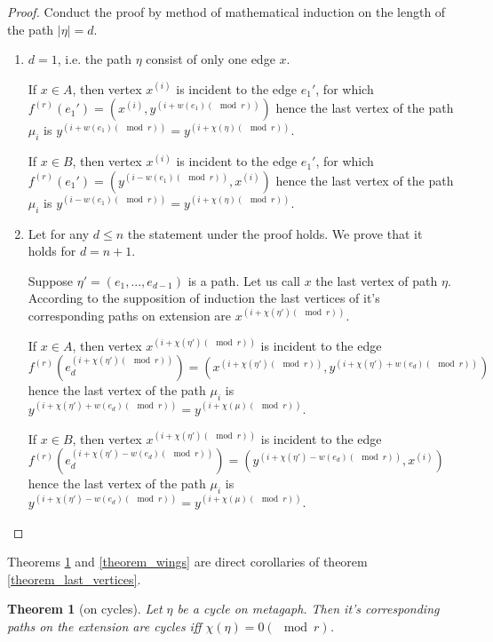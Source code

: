 \documentclass[14pt]{mmcs-article}
\newtheorem{theorem}{Theorem}
\begin{document}
\begin{proof}
    Conduct the proof by method of mathematical induction on the length of the path $|\eta| = d$.
    
    \begin{enumerate}
    \item $d = 1$, i.e. the path $\eta$ consist of only one edge $x$.
    
    If $x \in A$, then vertex $x^{(i)}$ is incident to the edge $e_1'$, for which $f^{(r)}(e_1') = (x^{(i)}, y^{(i + w(e_1) (\mod{r}))})$ hence the last vertex of the path $\mu_i$ is $y^{(i + w(e_1) (\mod{r}))} = y^{(i + \chi(\eta) (\mod{r}))}$.
    
    If $x \in B$, then vertex $x^{(i)}$ is incident to the edge $e_1'$, for which $f^{(r)}(e_1') = (y^{(i - w(e_1) (\mod{r}))}, x^{(i)})$ hence the last vertex of the path $\mu_i$ is $y^{(i - w(e_1) (\mod{r}))} = y^{(i + \chi(\eta) (\mod{r}))}$.
    
    \item Let for any $d \leq n$ the statement under the proof holds. We prove that it holds for $d = n + 1$.

    Suppose $\eta' = (e_1, ..., e_{d - 1})$ is a path. Let us call $x$ the last vertex of path $\eta$. According to the supposition of induction the last vertices of it's corresponding paths on extension are $x^{(i + \chi(\eta')(\mod{r}))}$.
    
    If $x \in A$, then vertex $x^{(i + \chi(\eta')(\mod{r}))}$ is incident to the edge $f^{(r)}(e_d^{(i + \chi(\eta')(\mod{r}))}) = (x^{(i + \chi(\eta')(\mod{r}))}, y^{(i + \chi(\eta') + w(e_d) (\mod{r}))})$ hence the last vertex of the path $\mu_i$ is $y^{(i + \chi(\eta') + w(e_d) (\mod{r}))} = y^{(i + \chi(\mu) (\mod{r}))}$.
    
    If $x \in B$, then vertex $x^{(i + \chi(\eta')(\mod{r}))}$ is incident to the edge $f^{(r)}(e_d^{(i + \chi(\eta') - w(e_d) (\mod{r}))}) = (y^{(i + \chi(\eta') - w(e_d) (\mod{r}))}, x^{(i)})$ hence the last vertex of the path $\mu_i$ is $y^{(i + \chi(\eta') - w(e_d) (\mod{r}))} = y^{(i + \chi(\mu) (\mod{r}))}$.  
    
    \end{enumerate}  
\end{proof}

Theorems \ref{theorem_cycles} and \ref{theorem_wings} are direct corollaries of theorem \ref{theorem_last_vertices}.

\begin{theorem}[on cycles]\label{theorem_cycles}
    Let $\eta$ be a cycle on metagaph. Then it's corresponding paths on the extension are cycles iff $\chi(\eta) = 0 (\mod{r})$.
\end{theorem}
\end{document}
